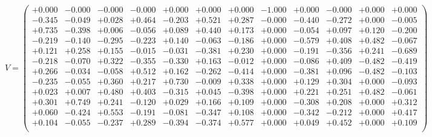 \documentclass[9pt]{article}
\theoremstyle{plain}
\theoremstyle{definition}
\theoremstyle{remark}
\numberwithin{equation}{section}
\begin{document}
$V = \left(
\begin{array}{
cccccccccccc}
+0.000 & -0.000 & -0.000 & -0.000 & +0.000 & +0.000 & +0.000 & -1.000 & +0.000 & -0.000 & +0.000 & +0.000 \\
-0.345 & -0.049 & +0.028 & +0.464 & -0.203 & +0.521 & +0.287 & -0.000 & -0.440 & -0.272 & +0.000 & -0.005 \\
+0.735 & -0.398 & +0.006 & -0.056 & +0.089 & +0.440 & +0.173 & +0.000 & -0.054 & +0.097 & +0.120 & -0.200 \\
-0.219 & -0.140 & -0.295 & -0.223 & +0.140 & -0.063 & -0.186 & +0.000 & -0.579 & +0.408 & +0.482 & -0.067 \\
+0.121 & +0.258 & +0.155 & -0.015 & -0.031 & -0.381 & +0.230 & +0.000 & -0.191 & -0.356 & +0.241 & -0.689 \\
-0.218 & -0.070 & +0.322 & -0.355 & -0.330 & +0.163 & -0.012 & +0.000 & -0.086 & +0.409 & -0.482 & -0.419 \\
+0.266 & -0.034 & -0.058 & +0.512 & +0.162 & -0.262 & -0.414 & +0.000 & -0.381 & +0.096 & -0.482 & -0.103 \\
-0.235 & -0.055 & +0.360 & +0.217 & +0.730 & -0.009 & +0.338 & +0.000 & +0.129 & +0.304 & +0.000 & -0.093 \\
+0.023 & +0.007 & +0.480 & +0.403 & -0.315 & +0.045 & -0.398 & +0.000 & +0.221 & +0.251 & +0.482 & -0.061 \\
+0.301 & +0.749 & +0.241 & -0.120 & +0.029 & +0.166 & +0.109 & +0.000 & -0.308 & +0.208 & +0.000 & +0.312 \\
+0.060 & -0.424 & +0.553 & -0.191 & -0.081 & -0.347 & +0.108 & +0.000 & -0.342 & -0.212 & +0.000 & +0.417 \\
+0.104 & -0.055 & -0.237 & +0.289 & -0.394 & -0.374 & +0.577 & +0.000 & +0.049 & +0.452 & +0.000 & +0.109 \\
\end{array}
\right)$ \newline 
\end{document}
